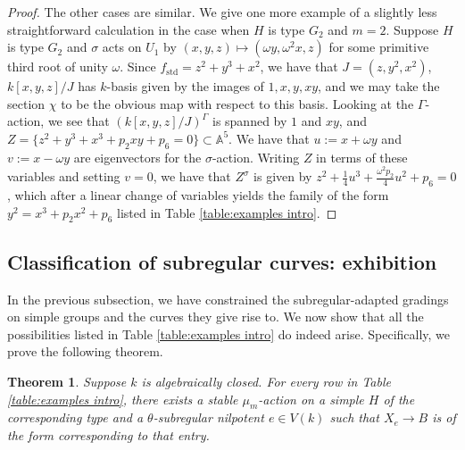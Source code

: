 \documentclass{article} %
\newtheorem{theorem}[proposition]{Theorem}
\numberwithin{equation}{section}
\theoremstyle{definition}
\newcommand{\A}{\mathbb{A}}
\begin{document}
\begin{proof}
The other cases are similar. 
We give one more example of a slightly less straightforward calculation in the case when $H$ is type $G_2$ and $m = 2$. Suppose $H$ is type $G_2$ and $\sigma$ acts on $U_1$ by $(x, y, z) \mapsto (\omega y, \omega^2 x, z)$ for some primitive third root of unity $\omega$. 
Since $f_{\mathrm{std}} = z^2 + y^3 + x^2$, we have that $J = (z, y^2, x^2)$, $k[x, y, z]/J$ has $k$-basis given by the images of $1, x, y, xy$, and we may take the section $\chi$ to be the obvious map with respect to this basis. Looking at the $\Gamma$-action, we see that $(k[x, y, z]/J)^\Gamma$ is spanned by $1$ and $xy$, and $Z = \{z^2 + y^3 + x^3 + p_2xy + p_6 = 0\} \subset \A^5$. We have that $u := x + \omega y$ and $v := x - \omega y$ are eigenvectors for the $\sigma$-action. Writing $Z$ in terms of these variables and setting $v = 0$, we have that $Z^\sigma$ is given by $z^2 + \frac{1}{4}u^3 + \frac{\omega^2 p_2}{4}u^2 + p_6 = 0$, which after a linear change of variables yields the family of the form $y^2 = x^3 + p_2x^2 + p_6$ listed in Table \ref{table:examples intro}.
\end{proof}






\subsection{Classification of subregular curves: exhibition}\label{subreg-exhibition}


In the previous subsection, we have constrained the subregular-adapted gradings on simple groups and the curves they give rise to. 
We now show that all the possibilities listed in Table \ref{table:examples intro} do indeed arise.
Specifically, we prove the following theorem.



\begin{theorem}\label{theorem:exhibitionsubregularcurves-algclosed}
    Suppose $k$ is algebraically closed.
    For every row in Table \ref{table:examples intro}, there exists a stable $\mu_m$-action on a simple $H$ of the corresponding type and a $\theta$-subregular nilpotent $e\in V(k)$ such that $X_e\rightarrow B$ is of the form corresponding to that entry.
\end{theorem}
\end{document}
